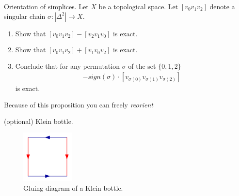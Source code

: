 
        
        \item Orientation of simplices.
    Let $X$ be a topological space.
    Let $[v_0 v_1 v_2]$ denote a singular chain $\sigma : | \Delta ^2 | \to X$.
    \begin{enumerate}
        \item Show that 
        $[v_0 v_1 v_2] - [v_2 v_1 v_0]$ is exact.
        \item Show that
        $[v_0 v_1 v_2] + [v_1 v_0 v_2]$ is exact.
        \item Conclude that for any permutation $\sigma$ of the set $ \{0, 1 , 2\}$ 
        \begin{align*}
            [v_0 v_1 v_2] - {sign(\sigma)} \cdot [v_{\sigma(0)} v_{\sigma(1)} v_{\sigma(2)}]
        \end{align*}
        is exact.
    \end{enumerate}
     Because of this proposition you can freely \emph{reorient}
        
            \item (optional) Klein bottle.
    \begin{figure}[h]
        \centering
        \includegraphics[width=100px]{images/klein-bottle.png}
        \caption{Gluing diagram of a Klein-bottle.}
    \end{figure} 
         
